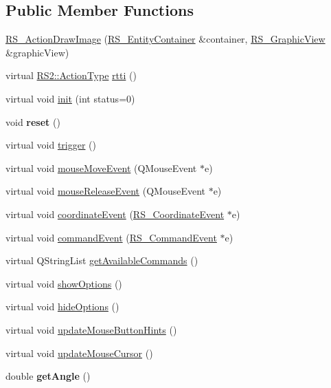 \subsection*{Public Member Functions}
\begin{DoxyCompactItemize}
\item 
\hyperlink{classRS__ActionDrawImage_af4869edb4ad3a39a68b1648e4fb64573}{R\-S\-\_\-\-Action\-Draw\-Image} (\hyperlink{classRS__EntityContainer}{R\-S\-\_\-\-Entity\-Container} \&container, \hyperlink{classRS__GraphicView}{R\-S\-\_\-\-Graphic\-View} \&graphic\-View)
\item 
virtual \hyperlink{classRS2_afe3523e0bc41fd637b892321cfc4b9d7}{R\-S2\-::\-Action\-Type} \hyperlink{classRS__ActionDrawImage_a1d2cb19830d80150ab59d685323fb449}{rtti} ()
\item 
virtual void \hyperlink{classRS__ActionDrawImage_a803881c868c3f039645900cba4e4d230}{init} (int status=0)
\item 
\hypertarget{classRS__ActionDrawImage_a723e6b2486cf313d3b0d94358c216fc4}{void {\bfseries reset} ()}\label{classRS__ActionDrawImage_a723e6b2486cf313d3b0d94358c216fc4}

\item 
virtual void \hyperlink{classRS__ActionDrawImage_a2e0bc369ed0dc0ec46baacc118792f04}{trigger} ()
\item 
virtual void \hyperlink{classRS__ActionDrawImage_ab80ba10f50da9f938b82e07e631d7aa9}{mouse\-Move\-Event} (Q\-Mouse\-Event $\ast$e)
\item 
virtual void \hyperlink{classRS__ActionDrawImage_a0701d02036d0027ab5190de404c3391c}{mouse\-Release\-Event} (Q\-Mouse\-Event $\ast$e)
\item 
virtual void \hyperlink{classRS__ActionDrawImage_acd6c7cae88a2f4181b2c6bc864113eb1}{coordinate\-Event} (\hyperlink{classRS__CoordinateEvent}{R\-S\-\_\-\-Coordinate\-Event} $\ast$e)
\item 
virtual void \hyperlink{classRS__ActionDrawImage_a48209c6483ba26de269625968f227034}{command\-Event} (\hyperlink{classRS__CommandEvent}{R\-S\-\_\-\-Command\-Event} $\ast$e)
\item 
virtual Q\-String\-List \hyperlink{classRS__ActionDrawImage_a7ec51411f200fc6ac3bd9dadd328966e}{get\-Available\-Commands} ()
\item 
virtual void \hyperlink{classRS__ActionDrawImage_a618381c10c600ceca48fb87c5aa412a8}{show\-Options} ()
\item 
virtual void \hyperlink{classRS__ActionDrawImage_a96c34937f019415189bd55c7332089e2}{hide\-Options} ()
\item 
virtual void \hyperlink{classRS__ActionDrawImage_ae47d7cf88aacf2956e213ee5aabcb7e8}{update\-Mouse\-Button\-Hints} ()
\item 
virtual void \hyperlink{classRS__ActionDrawImage_a79fb23f97c142dc8e623b15b0bbce91a}{update\-Mouse\-Cursor} ()
\item 
\hypertarget{classRS__ActionDrawImage_a0c8959649e409b895b327fb691af1a87}{double {\bfseries get\-Angle} ()}\label{classRS__ActionDrawImage_a0c8959649e409b895b327fb691af1a87}


\end{DoxyCompactItemize}
